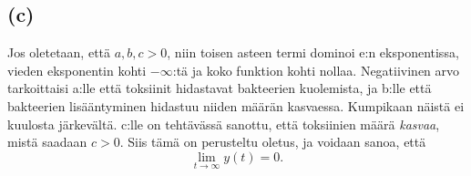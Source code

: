 \documentclass{article}
\begin{document}
\subsection*{(c)}

Jos oletetaan, että $a, b, c > 0$, niin toisen asteen termi dominoi e:n
eksponentissa, vieden eksponentin kohti $-\infty$:tä ja koko funktion kohti
nollaa. Negatiivinen arvo tarkoittaisi a:lle että toksiinit hidastavat
bakteerien kuolemista, ja b:lle että bakteerien lisääntyminen hidastuu niiden
määrän kasvaessa.  Kumpikaan näistä ei kuulosta järkevältä. c:lle on tehtävässä
sanottu, että toksiinien määrä \textit{kasvaa}, mistä saadaan $c > 0$.
Siis tämä on perusteltu oletus, ja voidaan sanoa, että
\[
  \lim_{t \rightarrow \infty} y(t) = 0.
\]
\end{document}
